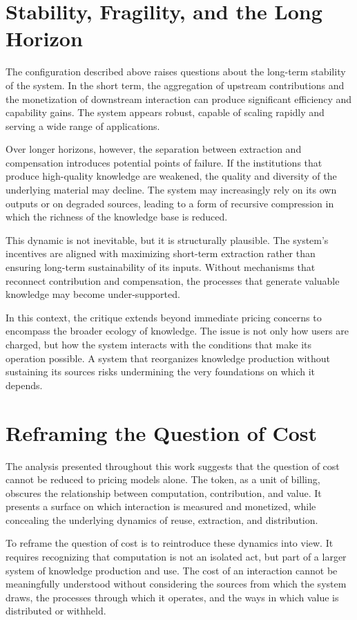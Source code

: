 \documentclass[12pt, oneside]{article}
\begin{document}
\section{Stability, Fragility, and the Long Horizon}

The configuration described above raises questions about the long-term stability of the system. In the short term, the aggregation of upstream contributions and the monetization of downstream interaction can produce significant efficiency and capability gains. The system appears robust, capable of scaling rapidly and serving a wide range of applications.

Over longer horizons, however, the separation between extraction and compensation introduces potential points of failure. If the institutions that produce high-quality knowledge are weakened, the quality and diversity of the underlying material may decline. The system may increasingly rely on its own outputs or on degraded sources, leading to a form of recursive compression in which the richness of the knowledge base is reduced.

This dynamic is not inevitable, but it is structurally plausible. The system's incentives are aligned with maximizing short-term extraction rather than ensuring long-term sustainability of its inputs. Without mechanisms that reconnect contribution and compensation, the processes that generate valuable knowledge may become under-supported.

In this context, the critique extends beyond immediate pricing concerns to encompass the broader ecology of knowledge. The issue is not only how users are charged, but how the system interacts with the conditions that make its operation possible. A system that reorganizes knowledge production without sustaining its sources risks undermining the very foundations on which it depends.

\section{Reframing the Question of Cost}

The analysis presented throughout this work suggests that the question of cost cannot be reduced to pricing models alone. The token, as a unit of billing, obscures the relationship between computation, contribution, and value. It presents a surface on which interaction is measured and monetized, while concealing the underlying dynamics of reuse, extraction, and distribution.

To reframe the question of cost is to reintroduce these dynamics into view. It requires recognizing that computation is not an isolated act, but part of a larger system of knowledge production and use. The cost of an interaction cannot be meaningfully understood without considering the sources from which the system draws, the processes through which it operates, and the ways in which value is distributed or withheld.
\end{document}
